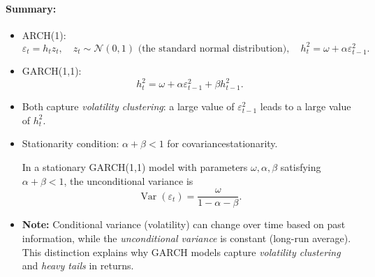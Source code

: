 \documentclass[11pt]{amsart}
\begin{document}
\paragraph{Summary:}
\begin{itemize}[noitemsep,left=0pt]
	\item ARCH(1):
	      \[
		      \varepsilon_t = h_t z_t,\quad z_t \sim \mathcal{N}(0,1)\text{ (the standard normal distribution)},
		      \quad
		      h_t^2 = \omega + \alpha \varepsilon_{t-1}^2.
	      \]
	\item GARCH(1,1):
	      \[
		      h_t^2 = \omega + \alpha \varepsilon_{t-1}^2 + \beta h_{t-1}^2.
	      \]
	\item Both capture \emph{volatility clustering}: a large value of $\varepsilon_{t-1}^2$ leads to a large value of $h_t^2$.
	\item Stationarity condition: $\alpha + \beta < 1$ for covariance\textendash stationarity.
	      \begin{proposition}
		      In a stationary GARCH(1,1) model with parameters $\omega, \alpha, \beta$ satisfying $\alpha + \beta < 1$, the unconditional variance is
		      \[
			      \operatorname{Var}(\varepsilon_t) = \frac{\omega}{1 - \alpha - \beta}.
		      \]
	      \end{proposition}
	\item \textbf{Note:} Conditional variance (volatility) can change over time based on past information, while the \emph{unconditional variance} is constant (long-run average). This distinction explains why GARCH models capture \emph{volatility clustering} and \emph{heavy tails} in returns.


\end{itemize}
\end{document}
